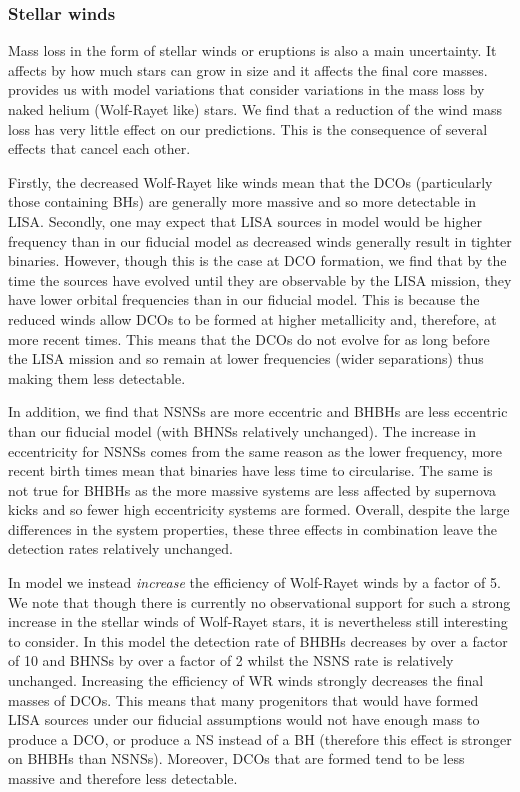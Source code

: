 \subsubsection{Stellar winds}
Mass loss in the form of stellar winds or eruptions is also a main uncertainty. It affects by how much stars can grow in size and it affects the final core masses. \citet{Broekgaarden+2021} provides us with model variations that consider variations in the mass loss by naked helium (Wolf-Rayet like) stars. We find that a reduction of the wind mass loss has very little effect on our predictions. This is the consequence of several effects that cancel each other. 

Firstly, the decreased Wolf-Rayet like winds mean that the DCOs (particularly those containing BHs) are generally more massive and so more detectable in LISA. Secondly, one may expect that LISA sources in model \modWRLow{} would be higher frequency than in our fiducial model as decreased winds generally result in tighter binaries. However, though this is the case at DCO formation, we find that by the time the sources have evolved until they are observable by the LISA mission, they have lower orbital frequencies than in our fiducial model. This is because the reduced winds allow DCOs to be formed at higher metallicity and, therefore, at more recent times. This means that the DCOs do not evolve for as long before the LISA mission and so remain at lower frequencies (wider separations) thus making them less detectable.

In addition, we find that NSNSs are more eccentric and BHBHs are less eccentric than our fiducial model (with BHNSs relatively unchanged). The increase in eccentricity for NSNSs comes from the same reason as the lower frequency, more recent birth times mean that binaries have less time to circularise. The same is not true for BHBHs as the more massive systems are less affected by supernova kicks and so fewer high eccentricity systems are formed. Overall, despite the large differences in the system properties, these three effects in combination leave the detection rates relatively unchanged.

In model \modWRHigh{} we instead \textit{increase} the efficiency of Wolf-Rayet winds by a factor of 5. We note that though there is currently no observational support for such a strong increase in the stellar winds of Wolf-Rayet stars, it is nevertheless still interesting to consider. In this model the detection rate of BHBHs decreases by over a factor of 10 and BHNSs by over a factor of 2 whilst the NSNS rate is relatively unchanged. Increasing the efficiency of WR winds strongly decreases the final masses of DCOs. This means that many progenitors that would have formed LISA sources under our fiducial assumptions would not have enough mass to produce a DCO, or produce a NS instead of a BH (therefore this effect is stronger on BHBHs than NSNSs). Moreover, DCOs that are formed tend to be less massive and therefore less detectable. 

